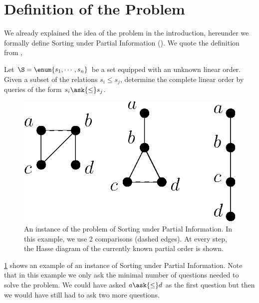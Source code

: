 \section{Definition of the Problem}

We already explained the idea of the problem in the introduction, hereunder we
formally define Sorting under Partial Information (\SUPI).
We quote the definition from \citet*{cardinal:2013},
\begin{problem}
Let $\S = \enum{s_1 , \cdots , s_n}$ be a set
equipped with an unknown linear order. Given a subset of the relations $s_i
\leq s_j$, determine the complete linear order by queries of the form
\(s_i \ask{\leq} s_j\).
\end{problem}

\begin{figure} \centering \includegraphics[height=0.2\textheight]{fig/supi/ex2}
\caption{An instance of the problem of Sorting under Partial Information. In
this example, we use 2 comparisons (dashed edges). At every step, the Hasse
diagram of the currently known partial order is shown.}
\label{fig:supi:def:ex2} \end{figure}

\ref{fig:supi:def:ex2} shows an example of an instance of Sorting under Partial
Information. Note that in this example we only ask the minimal number of
questions needed to solve the problem. We could have asked $a \ask{\le}
d$ as the first question but then we would have still had to ask two more
questions.
